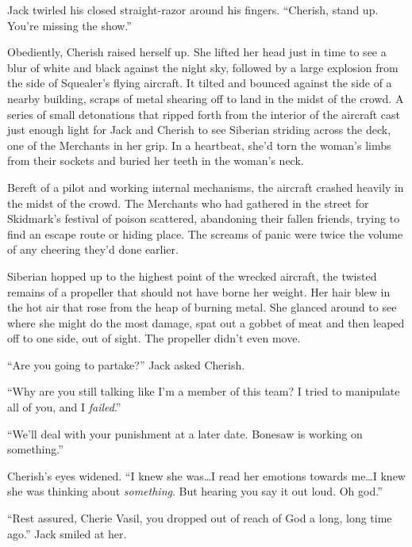 Jack twirled his closed straight-razor around his fingers.  ``Cherish, stand up.  You're missing the show.''



Obediently, Cherish raised herself up.  She lifted her head just in time to see a blur of white and black against the night sky, followed by a large explosion from the side of Squealer's flying aircraft.  It tilted and bounced against the side of a nearby building, scraps of metal shearing off to land in the midst of the crowd.  A series of small detonations that ripped forth from the interior of the aircraft cast just enough light for Jack and Cherish to see Siberian striding across the deck, one of the Merchants in her grip.  In a heartbeat, she'd torn the woman's limbs from their sockets and buried her teeth in the woman's neck.



Bereft of a pilot and working internal mechanisms, the aircraft crashed heavily in the midst of the crowd.  The Merchants who had gathered in the street for Skidmark's festival of poison scattered, abandoning their fallen friends, trying to find an escape route or hiding place.  The screams of panic were twice the volume of any cheering they'd done earlier.



Siberian hopped up to the highest point of the wrecked aircraft, the twisted remains of a propeller that should not have borne her weight.  Her hair blew in the hot air that rose from the heap of burning metal.  She glanced around to see where she might do the most damage, spat out a gobbet of meat and then leaped off to one side, out of sight.  The propeller didn't even move.



``Are you going to partake?'' Jack asked Cherish.



``Why are you still talking like I'm a member of this team?  I tried to manipulate all of you, and I \emph{failed}.''



``We'll deal with your punishment at a later date.  Bonesaw is working on something.''



Cherish's eyes widened.  ``I knew she was\ldots I read her emotions towards me\ldots I knew she was thinking about \emph{something}.  But hearing you say it out loud.  Oh god.''



``Rest assured, Cherie Vasil, you dropped out of reach of God a long, long time ago.'' Jack smiled at her.



